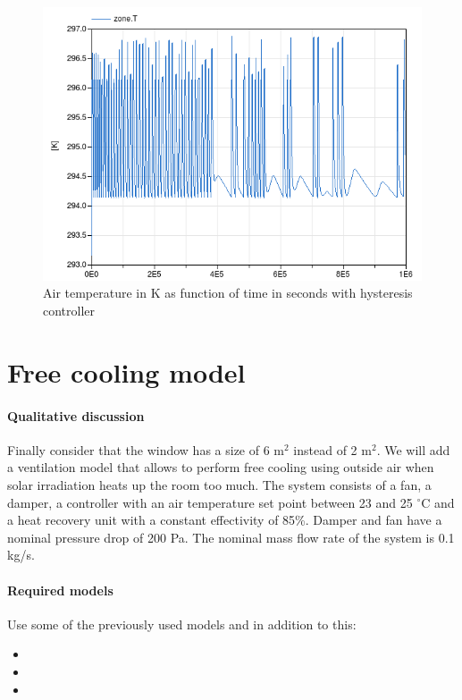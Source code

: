 \documentclass[10pt,a4paper]{article}
\begin{document}
\begin{figure}
\centering
\includegraphics[scale=0.6]{result5.png}
\caption{Air temperature in K as function of time in seconds with hysteresis controller}
\label{fig:res5}
\end{figure}


\section{Free cooling model}
\paragraph{Qualitative discussion}
Finally consider that the window has a size of
6 m$^2$ instead of 2 m$^2$.
We will add a ventilation model that allows to
perform free cooling using outside air when
solar irradiation heats up the room too much.
The system consists of a fan,
a damper,
a controller with an air temperature 
set point between 23 and 25 $^{\circ}$C
and a heat recovery unit with a constant effectivity of 85\%.
Damper and fan have a nominal pressure drop of 200 Pa. 
The nominal mass flow rate of the system is 0.1 kg/s.


\paragraph{Required models}
Use some of the previously used models and in addition to this:
\begin{itemize}
\item {}
\item {}
\item {}
\end{itemize}
\end{document}
